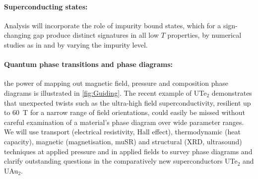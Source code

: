 \paragraph{Superconducting states:}
Analysis will incorporate the role of impurity bound states, which for a sign-changing gap produce distinct signatures in  all low $T$ properties, by numerical studies as in \cite{bang17} and by varying the impurity level.

\paragraph{Quantum phase transitions and phase diagrams:} 
the power of mapping out magnetic field, pressure and composition phase diagrams is illustrated in \autoref{fig:Guiding}. The recent example of UTe$_2$ demonstrates that unexpected twists such as the ultra-high field superconductivity, resilient up to \SI{60}{\tesla} for a narrow range of field orientations, could easily be missed without careful examination of a material's phase diagram over wide parameter ranges. 
We will use transport (electrical resistivity, Hall effect), thermodynamic (heat capacity), magnetic (magnetisation, muSR) and structural (XRD, ultrasound) techniques at applied pressure and in applied fields to survey phase diagrams and clarify outstanding questions in the comparatively new superconductors UTe$_2$ and UAu$_2$. 



